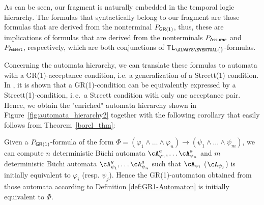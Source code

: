 \documentclass[submission,copyright,creativecommons]{eptcs}
\newcommand{\ie}{i.\,e.~}
\begin{document}
As can be seen, our \LTL{} fragment is naturally embedded in the temporal logic hierarchy. The formulas that syntactically belong to our \LTL{} fragment are those formulas that are derived from the nonterminal $P_{\sf GR(1)}$, thus, these are implications of formulas that are derived from the nonterminals $P_{\sf Assume}$ and $P_{\sf Assert}$, respectively, which are both conjunctions of ${\sf TL}_{\ALWAYS\EVENTUAL{}}$-formulas. 

\noindent Concerning the automata hierarchy, we can translate these formulas to automata with a GR(1)-acceptance condition, i.e. a generalization of a Streett(1) condition. In \cite{BCGH10}, it is shown that a GR(1)-condition can be equivalently expressed by a Streett(1)-condition, \ie a Streett condition with only one acceptance pair. Hence, we obtain the "enriched" automata hierarchy shown in Figure~\ref{fig:automata_hierarchy2} together with the following corollary that easily follows from Theorem~\ref{borel_thm}:

\begin{corollary}
Given a $P_{\sf GR(1)}$-formula of the form $\Phi=\left(\varphi_1\wedge\ldots\wedge\varphi_n\right) \rightarrow \left(\psi_1 \wedge  \ldots\wedge\psi_m\right)$, we can compute $n$ deterministic Büchi automata $\cA_{\varphi_1}^a, \ldots \cA_{\varphi_n}^a$ and $m$ deterministic Büchi automata $\cA_{\psi_1}^g, \ldots \cA_{\psi_n}^g$ such that $\cA_{\varphi_i}$ ($\cA_{\psi_j}$) is initially equivalent to $\varphi_i$ (resp. $\psi_j$). Hence the GR(1)-automaton obtained from those automata according to Definition \ref{def:GR1-Automaton} is initially equivalent to $\Phi$.
\end{corollary}
\end{document}
